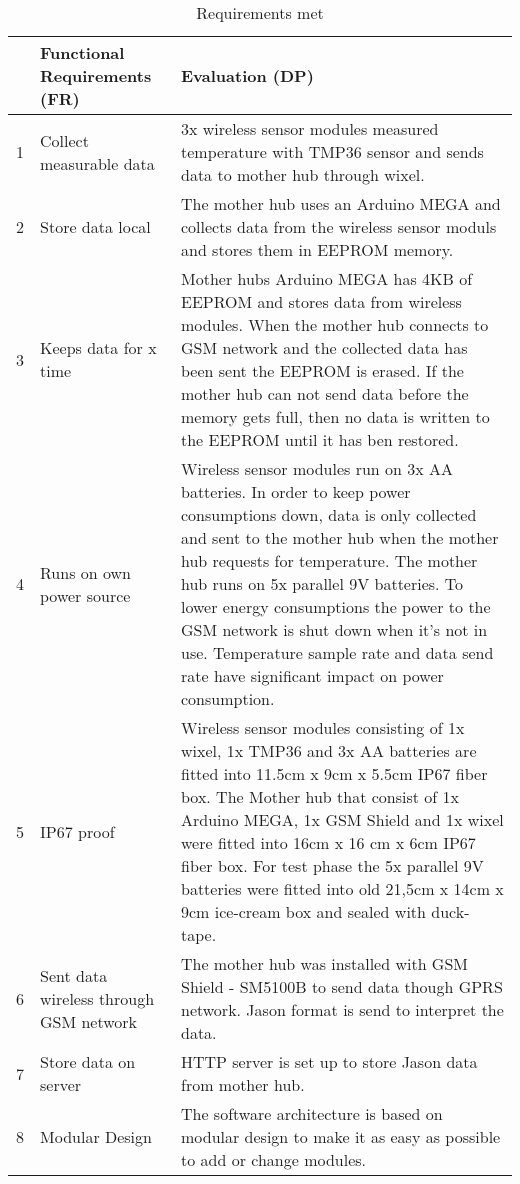  \begin{table}[H]
 	\caption{Requirements met}
 	\label{tbl:FR-Eva}
 	\begin{tabular}{|l|p{4cm}| p{} |}
 		
 		\hline
 		& \textbf{Functional Requirements (FR)}  & \textbf{Evaluation (DP)} \\  
 		\hline 1 &  Collect measurable data & 3x wireless sensor modules measured temperature with  TMP36 \cite{Devices2010} sensor and sends data to mother hub through wixel. \\ 
 		           		
 		\hline 2 & Store data local &   The mother hub uses an Arduino MEGA and collects data from the wireless sensor moduls and stores them in EEPROM memory. \\
 	
 		\hline 3 & Keeps data for x time &  Mother hubs Arduino MEGA \cite{arduinoMega} has 4KB of EEPROM and stores  data from wireless modules. When the mother hub connects to GSM network and the collected data has been sent the EEPROM is erased. If the mother hub can not send data before the memory gets full, then no data is written to the EEPROM until it has ben restored.  \\
 	
 		\hline 4 & Runs on own power source & Wireless sensor modules run on 3x AA batteries. In order to keep power consumptions down, data is only collected and sent to the mother hub when the mother hub requests for temperature. The mother hub runs on 5x parallel 9V batteries.  To lower energy consumptions the power to the GSM network is shut down when it's not in use. Temperature sample rate and data send rate have significant impact on power consumption. \\ 
 	
 		\hline 5 & IP67 proof &   Wireless sensor modules consisting of 1x wixel, 1x TMP36 and 3x AA batteries are fitted into 11.5cm x 9cm x 5.5cm IP67 fiber box. The Mother hub that consist of 1x Arduino MEGA, 1x GSM Shield and 1x wixel were fitted into 16cm x 16 cm x 6cm IP67 fiber box. For test phase the 5x parallel 9V batteries were fitted into old 21,5cm x 14cm x 9cm ice-cream box and sealed with duck-tape. \\
 	
 		\hline 6 & Sent data wireless through GSM network & The mother hub was installed with GSM Shield - SM5100B \cite{SMP5100B} to send data though GPRS network. Jason format is send to interpret the data. \\ 
 	
 		\hline 7 & Store data on server & HTTP server is set up to store Jason data from mother hub. \\ 
 	
 		\hline 8 & Modular Design & The software architecture is based on modular design to make it as easy as possible to add or change modules.  \\
 		\hline
 	\end{tabular}
 \end{table}

